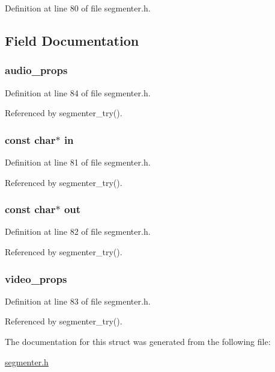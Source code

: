 \-Definition at line 80 of file segmenter.\-h.



\subsection{\-Field \-Documentation}
\hypertarget{struct__params_a219b79cb42ef34f697906a8d8366c947}{
\subsubsection[{audio\-\_\-props}]{ {\bf audio\-\_\-props}}}\label{struct__params_a219b79cb42ef34f697906a8d8366c947}


\-Definition at line 84 of file segmenter.\-h.



\-Referenced by segmenter\-\_\-try().

\hypertarget{struct__params_a52bb50fce643c4899922808db7d60d42}{
\subsubsection[{in}]{\setlength{\rightskip}{0pt plus 5cm}const char$\ast$ {\bf in}}}\label{struct__params_a52bb50fce643c4899922808db7d60d42}


\-Definition at line 81 of file segmenter.\-h.



\-Referenced by segmenter\-\_\-try().

\hypertarget{struct__params_a8905de849f303a8598c0f7c3d37d46ed}{
\subsubsection[{out}]{\setlength{\rightskip}{0pt plus 5cm}const char$\ast$ {\bf out}}}\label{struct__params_a8905de849f303a8598c0f7c3d37d46ed}


\-Definition at line 82 of file segmenter.\-h.



\-Referenced by segmenter\-\_\-try().

\hypertarget{struct__params_ae8e5c5323efdf97ec1e66866b906f813}{
\subsubsection[{video\-\_\-props}]{ {\bf video\-\_\-props}}}\label{struct__params_ae8e5c5323efdf97ec1e66866b906f813}


\-Definition at line 83 of file segmenter.\-h.



\-Referenced by segmenter\-\_\-try().



\-The documentation for this struct was generated from the following file\-:\begin{DoxyCompactItemize}
\item 
\hyperlink{segmenter_8h}{segmenter.\-h}\end{DoxyCompactItemize}
